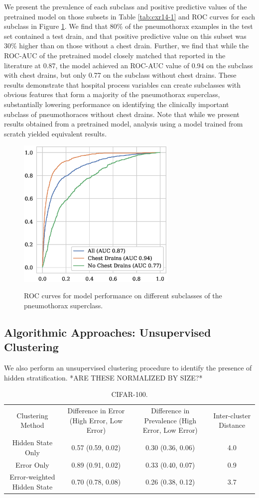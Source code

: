 \documentclass{article}
\begin{document}
 We present the prevalence of each subclass and positive predictive values of the pretrained model on those subsets in Table \ref{tab:cxr14-1} and ROC curves for each subclass in Figure \ref{fig:cxr14}.  
 We find that 80\% of the pneumothorax examples in the test set contained a test drain, and that positive predictive value on this subset was 30\% higher than on those without a chest drain.  
 Further, we find that while the ROC-AUC of the pretrained model closely matched that reported in the literature at 0.87, the model achieved an ROC-AUC value of 0.94 on the subclass with chest drains, but only 0.77 on the subclass without chest drains.  
 These results demonstrate that hospital process variables can create subclasses with obvious features that form a majority of the pneumothorax superclass, substantially lowering performance on identifying the clinically important subclass of pneumothoraces without chest drains.  
 Note that while we present results obtained from a pretrained model, analysis using a model trained from scratch yielded equivalent results. 

 \begin{figure}[htb!]
 \centering
\includegraphics[width=3in]{Pneumo-ROC.eps}
\label{fig:cxr14}
\caption{ROC curves for model performance on different subclasses of the pneumothorax superclass.}
\end{figure}

\subsection{Algorithmic Approaches: Unsupervised Clustering}

We also perform an unsupervised clustering procedure to identify the presence of hidden stratification. *ARE THESE NORMALIZED BY SIZE?*


 \begin{table}[]
 \centering
\begin{tabular}{cccc}
 Clustering Method & Difference in Error (High Error, Low Error) & Difference in Prevalence (High Error, Low Error) & Inter-cluster Distance \\
 Hidden State Only & 0.57 (0.59, 0.02) & 0.30 (0.36, 0.06) & 4.0 \\
 Error Only & 0.89 (0.91, 0.02) & 0.33 (0.40, 0.07) & 0.9 \\
 Error-weighted Hidden State & 0.70 (0.78, 0.08) & 0.26 (0.38, 0.12) & 3.7
\end{tabular}
\label{tab:clustercifar-1}
\caption{ CIFAR-100.}
\end{table}
\end{document}
